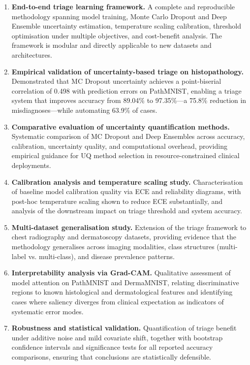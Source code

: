 \begin{enumerate}
    \item \textbf{End-to-end triage learning framework.} A complete and reproducible methodology spanning model training, Monte Carlo Dropout and Deep Ensemble uncertainty estimation, temperature scaling calibration, threshold optimisation under multiple objectives, and cost-benefit analysis. The framework is modular and directly applicable to new datasets and architectures.

    \item \textbf{Empirical validation of uncertainty-based triage on histopathology.} Demonstrated that MC Dropout uncertainty achieves a point-biserial correlation of 0.498 with prediction errors on PathMNIST, enabling a triage system that improves accuracy from 89.04\% to 97.35\%—a 75.8\% reduction in misdiagnoses—while automating 63.9\% of cases.

    \item \textbf{Comparative evaluation of uncertainty quantification methods.} Systematic comparison of MC Dropout and Deep Ensembles across accuracy, calibration, uncertainty quality, and computational overhead, providing empirical guidance for UQ method selection in resource-constrained clinical deployments.

    \item \textbf{Calibration analysis and temperature scaling study.} Characterisation of baseline model calibration quality via ECE and reliability diagrams, with post-hoc temperature scaling shown to reduce ECE substantially, and analysis of the downstream impact on triage threshold and system accuracy.

    \item \textbf{Multi-dataset generalisation study.} Extension of the triage framework to chest radiography and dermatoscopy datasets, providing evidence that the methodology generalises across imaging modalities, class structures (multi-label vs. multi-class), and disease prevalence patterns.

    \item \textbf{Interpretability analysis via Grad-CAM.} Qualitative assessment of model attention on PathMNIST and DermaMNIST, relating discriminative regions to known histological and dermatological features and identifying cases where saliency diverges from clinical expectation as indicators of systematic error modes.

    \item \textbf{Robustness and statistical validation.} Quantification of triage benefit under additive noise and mild covariate shift, together with bootstrap confidence intervals and significance tests for all reported accuracy comparisons, ensuring that conclusions are statistically defensible.
\end{enumerate}

